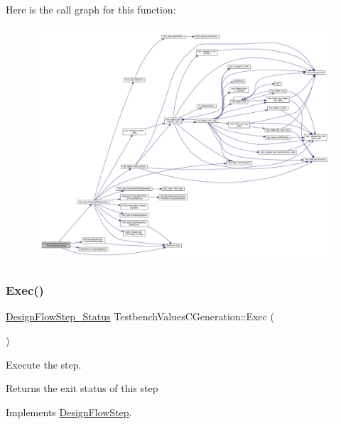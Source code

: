 Here is the call graph for this function\+:
\nopagebreak
\begin{figure}[H]
\begin{center}
\leavevmode
\includegraphics[width=350pt]{d9/d7b/classTestbenchValuesCGeneration_a3724358a7237a76d6446d9bcb1ffff7c_cgraph}
\end{center}
\end{figure}
\mbox{\label{classTestbenchValuesCGeneration_a964570c06f70ce449d63410d9e7b6d81}} 
\subsubsection{\texorpdfstring{Exec()}{Exec()}}
{\footnotesize\ttfamily \hyperlink{design__flow__step_8hpp_afb1f0d73069c26076b8d31dbc8ebecdf}{Design\+Flow\+Step\+\_\+\+Status} Testbench\+Values\+C\+Generation\+::\+Exec (\begin{DoxyParamCaption}{ }\end{DoxyParamCaption})\hspace{0.3cm}{\ttfamily [virtual]}}



Execute the step. 

\begin{DoxyReturn}{Returns}
the exit status of this step 
\end{DoxyReturn}


Implements \hyperlink{classDesignFlowStep_a77d7e38493016766098711ea24f60b89}{Design\+Flow\+Step}.



